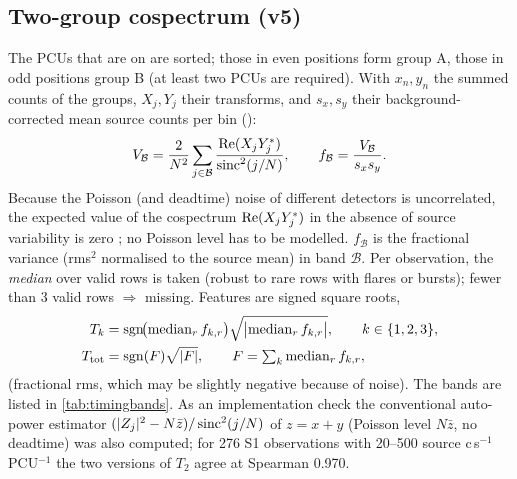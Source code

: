 \subsection{Two-group cospectrum (v5)}\label{sec:v5timing}
The PCUs that are on are sorted; those in even positions form group A, those in odd positions group B (at least two
PCUs are required). With $x_n,y_n$ the summed counts of the groups, $X_j,Y_j$ their transforms, and $s_x,s_y$ their
background-corrected mean source counts per bin ():
\begin{equation}
V_\mathcal{B} = \frac{2}{N^2}\sum_{j\in\mathcal B}\frac{\operatorname{Re}(X_jY_j^{*})}{\operatorname{sinc}^2(j/N)},\qquad f_\mathcal{B} = \frac{V_\mathcal{B}}{s_x s_y} .\label{eq:v5cross}
\end{equation}
Because the Poisson (and deadtime) noise of different detectors is uncorrelated, the expected value of the cospectrum
$\operatorname{Re}(X_jY_j^*)$ in the absence of source variability is zero \citep{Bachetti2015,BachettiHuppenkothen2018}; no Poisson
level has to be modelled. $f_\mathcal{B}$ is the fractional variance (rms$^2$ normalised to the source mean) in band
$\mathcal B$. Per observation, the \emph{median} over valid rows is taken (robust to rare rows with flares or bursts);
fewer than 3 valid rows $\Rightarrow$ missing. Features are signed square roots,
\begin{equation}
\begin{split}
T_k &= \operatorname{sgn}\!\bigl(\operatorname{median}_r f_{k,r}\bigr)\sqrt{\bigl|\operatorname{median}_r f_{k,r}\bigr|},\qquad k\in\{1,2,3\},\\
T_\mathrm{tot} &= \operatorname{sgn}(F)\sqrt{|F|},\qquad F=\textstyle\sum_k \operatorname{median}_r f_{k,r},
\end{split}\label{eq:signedsqrt}
\end{equation}
(fractional rms, which may be slightly negative because of noise). The bands are listed in \cref{tab:timingbands}.
As an implementation check the conventional auto-power estimator $(|Z_j|^2 - N\bar z)/\operatorname{sinc}^2(j/N)$ of $z=x+y$
(Poisson level $N\bar z$, no deadtime) was also computed; for 276 S1 observations with 20--500 source c\,s$^{-1}$\,PCU$^{-1}$
the two versions of $T_2$ agree at Spearman 0.970.

